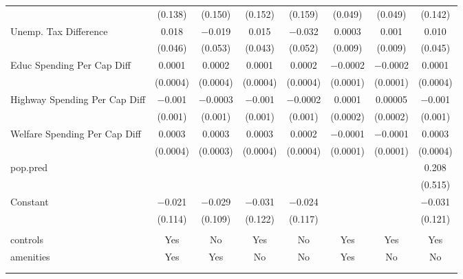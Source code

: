 \begin{table}[!htbp]
\begin{tabular}{@{\extracolsep{5pt}}lccccccc}
  & (0.138) & (0.150) & (0.152) & (0.159) & (0.049) & (0.049) & (0.142) \\ 
  Unemp. Tax Difference & 0.018 & $-$0.019 & 0.015 & $-$0.032 & 0.0003 & 0.001 & 0.010 \\ 
  & (0.046) & (0.053) & (0.043) & (0.052) & (0.009) & (0.009) & (0.045) \\ 
  Educ Spending Per Cap Diff & 0.0001 & 0.0002 & 0.0001 & 0.0002 & $-$0.0002 & $-$0.0002 & 0.0001 \\ 
  & (0.0004) & (0.0004) & (0.0004) & (0.0004) & (0.0001) & (0.0001) & (0.0004) \\ 
  Highway Spending Per Cap Diff & $-$0.001 & $-$0.0003 & $-$0.001 & $-$0.0002 & 0.0001 & 0.00005 & $-$0.001 \\ 
  & (0.001) & (0.001) & (0.001) & (0.001) & (0.0002) & (0.0002) & (0.001) \\ 
  Welfare Spending Per Cap Diff & 0.0003 & 0.0003 & 0.0003 & 0.0002 & $-$0.0001 & $-$0.0001 & 0.0003 \\ 
  & (0.0004) & (0.0003) & (0.0004) & (0.0004) & (0.0001) & (0.0001) & (0.0004) \\ 
  pop.pred &  &  &  &  &  &  & 0.208 \\ 
  &  &  &  &  &  &  & (0.515) \\ 
  Constant & $-$0.021 & $-$0.029 & $-$0.031 & $-$0.024 &  &  & $-$0.031 \\ 
  & (0.114) & (0.109) & (0.122) & (0.117) &  &  & (0.121) \\ 
 \hline \\[-1.8ex] 
controls & Yes & No & Yes & No & Yes & Yes & Yes \\ 
amenities & Yes & Yes & No & No & Yes & No & No \\ 
\hline \\[-1.8ex] 
\hline 
\hline \\[-1.8ex] 
\end{tabular} 
\end{table} 
